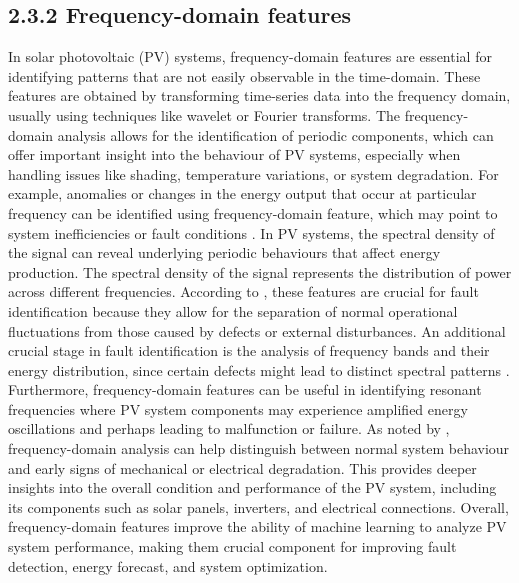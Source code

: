 \subsection{2.3.2 Frequency-domain features}
In solar photovoltaic (PV) systems, frequency-domain features are essential for identifying patterns that are not easily observable in the time-domain. These features are obtained by transforming time-series data into the frequency domain, usually using techniques like wavelet or Fourier transforms. The frequency-domain analysis allows for the identification of periodic components, which can offer important insight into the behaviour of PV systems, especially when handling issues like shading, temperature variations, or system degradation. For example, anomalies or changes in the energy output that occur at particular frequency can be identified using frequency-domain feature, which may point to system inefficiencies or fault conditions \parencite{Shen et al._2020}. In PV systems, the spectral density of the signal can reveal underlying periodic behaviours that affect energy production. The spectral density of the signal represents the distribution of power across different frequencies. According to \parencite{Kumar et al._2020}, these features are crucial for fault identification because they allow for the separation of normal operational fluctuations from those caused by defects or external disturbances. An additional crucial stage in fault identification is the analysis of frequency bands and their energy distribution, since certain defects might lead to distinct spectral patterns \parencite{Shen et al._2020}. Furthermore, frequency-domain features can be useful in identifying resonant frequencies where PV system components may experience amplified energy oscillations and perhaps leading to malfunction or failure. As noted by \parencite{Zhang et al._2020}, frequency-domain analysis can help distinguish between normal system behaviour and early signs of mechanical or electrical degradation. This provides deeper insights into the overall condition and performance of the PV system, including its components such as solar panels, inverters, and electrical connections. Overall, frequency-domain features improve the ability of machine learning to analyze PV system performance, making them crucial component for improving fault detection, energy forecast, and system optimization.

